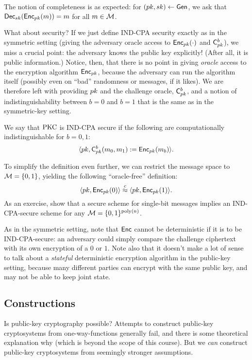 \documentclass[11pt]{article}
\begin{document}
The notion of completeness is as expected: for $(pk, sk) \gets
\mathsf{Gen}$, we ask that $\mathsf{Dec}_{sk}(\mathsf{Enc}_{pk}(m)) = m$ for all $m
\in \mathcal{M}$.

What about security?  If we just define IND-CPA security exactly as in
the symmetric setting (giving the adversary oracle access to
$\mathsf{Enc}_{pk}(\cdot)$ and $\mathsf{C}_{pk}^{b}$), we miss a crucial
point: the adversary knows the public key explicitly!  (After all, it
is public information.)  Notice, then, that there is no point in
giving \emph{oracle} access to the encryption algorithm
$\mathsf{Enc}_{pk}$, because the adversary can run the algorithm itself
(possibly even on ``bad'' randomness or messages, if it likes).  We
are therefore left with providing $pk$ and the challenge oracle,
$\mathsf{C}_{pk}^{b}$, and a notion of indistinguishability between $b
= 0$ and $b = 1$ that is the same as in the symmetric-key setting.

\begin{definition}
  \label{def:ind-cpa-pkc}
  We say that $\text{PKC}$ is IND-CPA secure if the following are
  computationally indistinguishable for $b = 0,1$: \[ \langle pk,
  \mathsf{C}^{b}_{pk}(m_{0}, m_{1}) := \mathsf{Enc}_{pk}(m_{b})
  \rangle. \]
\end{definition}

To simplify the definition even further, we can restrict the message
space to $\mathcal{M} = \{0,1\}$, yielding the following ``oracle-free''
definition:
\[ \langle pk, \mathsf{Enc}_{pk}(0) \rangle \stackrel{c}{\approx} \langle pk,
\mathsf{Enc}_{pk}(1) \rangle. \] As an exercise, show that a secure scheme
for single-bit messages implies an IND-CPA-secure scheme for any
$\mathcal{M} = \{0,1\}^{\operatorname{poly}(n)}$.

As in the symmetric setting, note that $\mathsf{Enc}$ cannot be
deterministic if it is to be IND-CPA-secure: an adversary could simply
compare the challenge ciphertext with its own encryption of a $0$ or
$1$.  Note also that it doesn't make a lot of sense to talk about a
\emph{stateful} deterministic encryption algorithm in the public-key
setting, because many different parties can encrypt with the same
public key, and may not be able to keep joint state.

\subsection{Constructions}
\label{sec:constructions}

Is public-key cryptography possible?  Attempts to construct public-key
cryptosystems from one-way-functions generally fail, and there is some
theoretical explanation why (which is beyond the scope of this
course).  But we \emph{can} construct public-key cryptosystems from
seemingly stronger assumptions.
\end{document}
